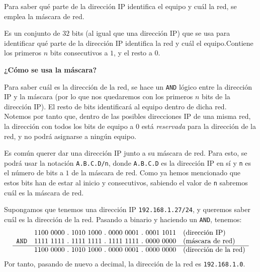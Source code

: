Para saber qué parte de la dirección IP identifica el equipo y cuál la red, se emplea la máscara de red.
\begin{definicion}
    Es un conjunto de $32$ bits (al igual que una dirección IP) que se usa para identificar qué parte de la dirección IP identifica la red y cuál el equipo.Contiene los primeros $n$ bits consecutivos a $1$, y el resto a $0$.
\end{definicion}
\textbf{¿Cómo se usa la máscara?}\

Para saber cuál es la dirección de la red, se hace un \verb|AND| lógico entre la dirección IP y la máscara (por lo que nos quedaremos con los primeros $n$ bits de la dirección IP\@). El resto de bits identificará al equipo dentro de dicha red.\\

Notemos por tanto que, dentro de las posibles direcciones IP de una misma red, la dirección con todos los bits de equipo a 0 está \emph{reservada} para la dirección de la red, y no podrá asignarse a ningún equipo.
\begin{notacion}
    Es común querer dar una dirección IP junto a su máscara de red. Para esto, se podrá usar la notación \verb|A.B.C.D/n|, donde \verb|A.B.C.D| es la dirección IP en sí y \verb|n| es el número de bits a $1$ de la máscara de red. Como ya hemos mencionado que estos bits han de estar al inicio y consecutivos, sabiendo el valor de \verb|n| sabremos cuál es la máscara de red.
\end{notacion}

\begin{ejemplo}
    Supongamos que tenemos una dirección IP \verb|192.168.1.27/24|, y queremos saber cuál es la dirección de la red. Pasando a binario y haciendo un \verb|AND|, tenemos:
    \begin{equation*}
        \begin{array}{rcl}
            & 1100~0000~.~1010~1000~.~0000~0001~.~0001~1011 & \text{(dirección IP)}\\
            \texttt{AND} & 1111~1111~.~1111~1111~.~1111~1111~.~0000~0000 & \text{(máscara de red)}\\ \hline
            & 1100~0000~.~1010~1000~.~0000~0001~.~0000~0000 & \text{(dirección de la red)}
        \end{array}
    \end{equation*}
    Por tanto, pasando de nuevo a decimal, la dirección de la red es \verb|192.168.1.0|.
\end{ejemplo}


